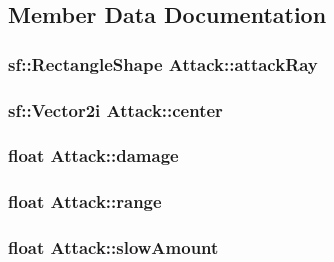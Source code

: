 \subsection{Member Data Documentation}
\hypertarget{class_attack_a1b7bb04e9eca7ef43e5f916f766e01d4}{
\subsubsection[{attack\+Ray}]{\setlength{\rightskip}{0pt plus 5cm}sf\+::\+Rectangle\+Shape Attack\+::attack\+Ray\hspace{0.3cm}{\ttfamily [protected]}}}\label{class_attack_a1b7bb04e9eca7ef43e5f916f766e01d4}
\hypertarget{class_attack_a93137b1d93ca34ea21026225eeda24af}{
\subsubsection[{center}]{\setlength{\rightskip}{0pt plus 5cm}sf\+::\+Vector2i Attack\+::center\hspace{0.3cm}{\ttfamily [protected]}}}\label{class_attack_a93137b1d93ca34ea21026225eeda24af}
\hypertarget{class_attack_aebc541003702819369c4645d425b8ba0}{
\subsubsection[{damage}]{\setlength{\rightskip}{0pt plus 5cm}float Attack\+::damage\hspace{0.3cm}{\ttfamily [protected]}}}\label{class_attack_aebc541003702819369c4645d425b8ba0}
\hypertarget{class_attack_aa3207fc391fcc38836dc35e2b7d07cd8}{
\subsubsection[{range}]{\setlength{\rightskip}{0pt plus 5cm}float Attack\+::range\hspace{0.3cm}{\ttfamily [protected]}}}\label{class_attack_aa3207fc391fcc38836dc35e2b7d07cd8}
\hypertarget{class_attack_ada6394cfb35919b6f84cfb390eb7c9ab}{
\subsubsection[{slow\+Amount}]{\setlength{\rightskip}{0pt plus 5cm}float Attack\+::slow\+Amount\hspace{0.3cm}{\ttfamily [protected]}}}\label{class_attack_ada6394cfb35919b6f84cfb390eb7c9ab}
